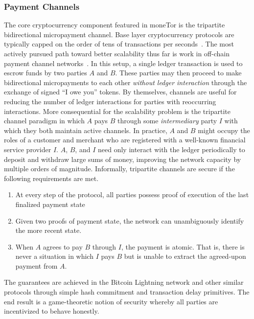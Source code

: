 \subsubsection{Payment Channels} The core cryptocurrency component featured in
moneTor is the tripartite bidirectional micropayment channel. Base layer
cryptocurrency protocols are typically capped on the order of tens of
transactions per seconds~\cite{team2018blockchain}. The most actively pursued
path toward better scalability thus far is work in off-chain payment channel
networks~\cite{poon2016bitcoin}. In this setup, a single ledger transaction is
used to escrow funds by two parties $A$ and $B$. These parties may then proceed
to make bidirectional micropayments to each other \emph{without ledger
  interaction} through the exchange of signed ``I owe you'' tokens. By
themselves, channels are useful for reducing the number of ledger interactions
for parties with reoccurring interactions. More consequential for the
scalability problem is the tripartite channel paradigm in which $A$ pays $B$
through some \emph{intermediary} party $I$ with which they both maintain active
channels. In practice, $A$ and $B$ might occupy the roles of a customer and
merchant who are registered with a well-known financial service provider
$I$. $A$, $B$, and $I$ need only interact with the ledger periodically to
deposit and withdraw large sums of money, improving the network capacity by
multiple orders of magnitude. Informally, tripartite channels are secure if the
following requirements are met.

\begin{enumerate}
\item At every step of the protocol, all parties possess proof of execution of
  the last finalized payment state
\item Given two proofs of payment state, the network can unambiguously identify
  the more recent state.
\item When $A$ agrees to pay $B$ through $I$, the payment is atomic. That is,
  there is never a situation in which $I$ pays $B$ but is unable to extract the
  agreed-upon payment from $A$.
\end{enumerate}

The guarantees are achieved in the Bitcoin Lightning network and other similar
protocols through simple hash commitment and transaction delay primitives. The
end result is a game-theoretic notion of security whereby all parties are
incentivized to behave honestly.


